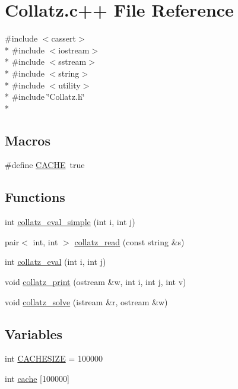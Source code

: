 \hypertarget{Collatz_8c_09_09}{\section{Collatz.\-c++ File Reference}
\label{Collatz_8c_09_09}
}
{\ttfamily \#include $<$cassert$>$}\\*
{\ttfamily \#include $<$iostream$>$}\\*
{\ttfamily \#include $<$sstream$>$}\\*
{\ttfamily \#include $<$string$>$}\\*
{\ttfamily \#include $<$utility$>$}\\*
{\ttfamily \#include \char`\"{}Collatz.\-h\char`\"{}}\\*
\subsection*{Macros}
\begin{DoxyCompactItemize}
\item 
\#define \hyperlink{Collatz_8c_09_09_a43fd55aa78bd891ebbd6a450f5eecce4}{C\-A\-C\-H\-E}~true
\end{DoxyCompactItemize}
\subsection*{Functions}
\begin{DoxyCompactItemize}
\item 
int \hyperlink{Collatz_8c_09_09_a932ab15698b4eb1a88d248878aa79877}{collatz\-\_\-eval\-\_\-simple} (int i, int j)
\item 
pair$<$ int, int $>$ \hyperlink{Collatz_8c_09_09_aeb2edb6ee16627fa3682f57c7cbf3662}{collatz\-\_\-read} (const string \&s)
\item 
int \hyperlink{Collatz_8c_09_09_a0b0d3827a619c18aa4d96b8ee8b1c47d}{collatz\-\_\-eval} (int i, int j)
\item 
void \hyperlink{Collatz_8c_09_09_aeda0b7ea3e40e1e7487ccc436f33a559}{collatz\-\_\-print} (ostream \&w, int i, int j, int v)
\item 
void \hyperlink{Collatz_8c_09_09_a0ac646d2122741f9a9a52201bf9551cc}{collatz\-\_\-solve} (istream \&r, ostream \&w)
\end{DoxyCompactItemize}
\subsection*{Variables}
\begin{DoxyCompactItemize}
\item 
int \hyperlink{Collatz_8c_09_09_ae78d3f3bc411293d88aa4f756ff6cfa5}{C\-A\-C\-H\-E\-S\-I\-Z\-E} = 100000
\item 
int \hyperlink{Collatz_8c_09_09_a1272eb6d3d210f7da48ebb71e2aa50f3}{cache} \mbox{[}100000\mbox{]}
\end{DoxyCompactItemize}


